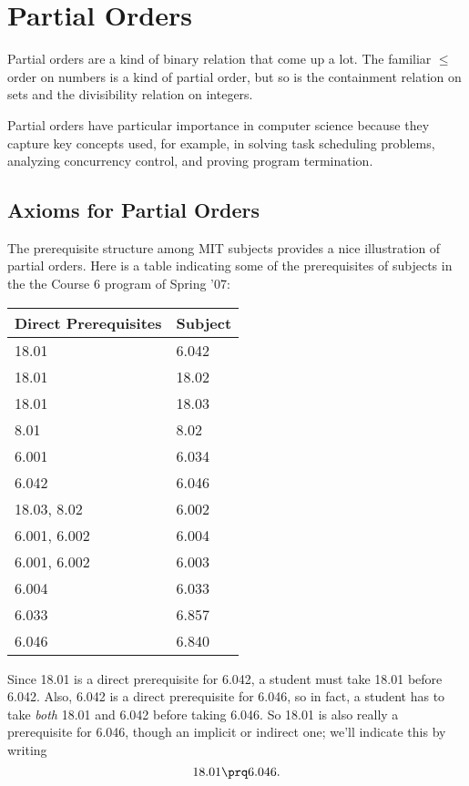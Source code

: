 \chapter{Partial Orders}\label{partial-order-chapter}


Partial orders are a kind of binary relation that come up a lot.  The
familiar $\leq$ order on numbers is a kind of partial order, but so is the
containment relation on sets and the divisibility relation on integers.

Partial orders have particular importance in computer science because they
capture key concepts used, for example, in solving task scheduling
problems, analyzing concurrency control, and proving program termination.

\section{Axioms for Partial Orders}

The prerequisite structure among MIT subjects provides a nice illustration
of partial orders.  Here is a table indicating some of the prerequisites of
subjects in the the Course 6 program of Spring '07:
\begin{center}
\begin{tabular}{|l|l|}
\hline
Direct Prerequisites & Subject\\ \hline
18.01 & 6.042\\ \hline
 18.01 & 18.02\\ \hline
 18.01 & 18.03\\ \hline
 8.01 & 8.02\\ \hline
 6.001 & 6.034\\ \hline
 6.042 & 6.046\\ \hline
 18.03, 8.02 & 6.002\\ \hline
 6.001, 6.002 & 6.004\\ \hline
 6.001, 6.002 & 6.003\\ \hline
 6.004 & 6.033\\ \hline
 6.033 & 6.857\\ \hline
 6.046 & 6.840\\ \hline
\end{tabular}
\end{center}

Since 18.01 is a direct prerequisite for 6.042, a student must take 18.01
before 6.042.  Also, 6.042 is a direct prerequisite for 6.046, so in fact,
a student has to take \emph{both} 18.01 and 6.042 before taking 6.046.  So
18.01 is also really a prerequisite for 6.046, though an implicit or
indirect one; we'll indicate this by writing
\[
18.01 \prq 6.046.
\]

